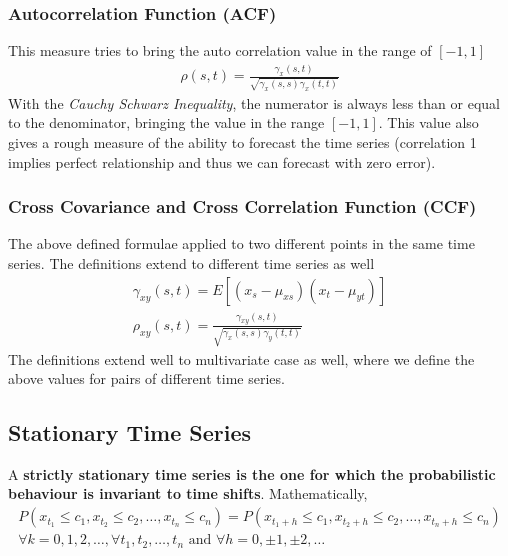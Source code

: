 \documentclass[../main.tex]{subfiles}
\begin{document}
    \subsubsection{Autocorrelation Function (ACF)}
    This measure tries to bring the auto correlation value in the range of $[-1,1]$
    \begin{align*}
        \rho(s,t) = \frac{\gamma_{x}(s,t)}{\sqrt{\gamma_{x}(s,s) \gamma_{x}(t,t)}}
    \end{align*}
    With the \emph{Cauchy Schwarz Inequality}, the numerator is always less than or equal to the denominator, bringing the value in the range $[-1,1]$. This value also gives a rough measure of the ability to forecast the time series (correlation 1 implies perfect relationship and thus we can forecast with zero error).

    \subsubsection{Cross Covariance and Cross Correlation Function (CCF)}
    The above defined formulae applied to two different points in the same time series. The definitions extend to different time series as well
    \begin{align*}
        \gamma_{xy}(s,t) = E[(x_{s} - \mu_{xs})(x_{t} - \mu_{yt})]\\
        \rho_{xy}(s,t) = \frac{\gamma_{xy}(s,t)}{\sqrt{\gamma_{x}(s,s) \gamma_{y}(t,t)}}
    \end{align*}
    The definitions extend well to multivariate case as well, where we define the above values for pairs of different time series.

    
    \subsection{Stationary Time Series}
    A \textbf{strictly stationary time series is the one for which the probabilistic behaviour is invariant to time shifts}. Mathematically,
    \begin{gather*}
        P(x_{t_{1}} \leq c_{1}, x_{t_{2}} \leq c_{2}, \ldots, x_{t_{n}} \leq c_{n}) = P(x_{t_{1}+h} \leq c_{1}, x_{t_{2}+h} \leq c_{2}, \ldots, x_{t_{n}+h} \leq c_{n})\\
    \forall k = 0,1,2,\ldots, \forall t_{1}, t_{2}, \ldots, t_{n} \text{ and } \forall h = 0, \pm 1, \pm 2, \ldots
    \end{gather*}
\end{document}
